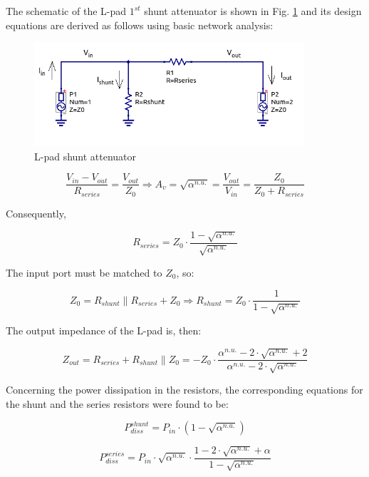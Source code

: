 \noindent The schematic of the L-pad $1^{st}$ shunt attenuator is shown in Fig. \ref{fig:l-pad-shunt-attenuator-schematic} and its design equations are derived as follows using basic network analysis:

  \begin{figure}[ht]
    \centering
    \includegraphics[width=10cm]{./images/l-pad-shunt-attenuator-schematic.png}
    \caption{L-pad shunt attenuator}
    \label{fig:l-pad-shunt-attenuator-schematic}
  \end{figure}
  
\begin{equation}
	\frac{V_{in} - V_{out}}{R_{series}} = \frac{V_{out}}{Z_0} \Rightarrow A_v = \sqrt{\alpha^{n.u.}} = \frac{V_{out}}{V_{in}} = \frac{Z_0}{Z_0 + R_{series}}
\end{equation}

\noindent Consequently,

\begin{equation}
	R_{series} = Z_0 \cdot \frac{1 - \sqrt{\alpha^{n.u.}}}{\sqrt{\alpha^{n.u.}}}
\end{equation}

\noindent The input port must be matched to $Z_0$, so:

\begin{equation}
	Z_0 = R_{shunt} \parallel R_{series} + Z_0 \Rightarrow R_{shunt} = Z_0 \cdot \frac{1}{1 - \sqrt{\alpha^{n.u.}}}
\end{equation}

\noindent The output impedance of the L-pad is, then:

\begin{equation}
	Z_{out} = R_{series} + R_{shunt} \parallel Z_0 = - Z_0 \cdot \frac{\alpha^{n.u.} - 2 \cdot \sqrt{\alpha^{n.u.}} + 2}{\alpha^{n.u.} - 2 \cdot \sqrt{\alpha^{n.u.}}}
\end{equation}

\noindent Concerning the power dissipation in the resistors, the corresponding equations for the shunt and the series resistors were found to be:

\begin{equation}
	P_{diss}^{shunt} = P_{in} \cdot \left( 1 - \sqrt{\alpha^{n.u.}}\right)
\end{equation}

\begin{equation}
	P_{diss}^{series} = P_{in} \cdot \sqrt{\alpha^{n.u.}} \cdot \frac{1 - 2 \cdot \sqrt{\alpha^{n.u.}} + \alpha}{1 - \sqrt{\alpha^{n.u.}}}
\end{equation}
  


